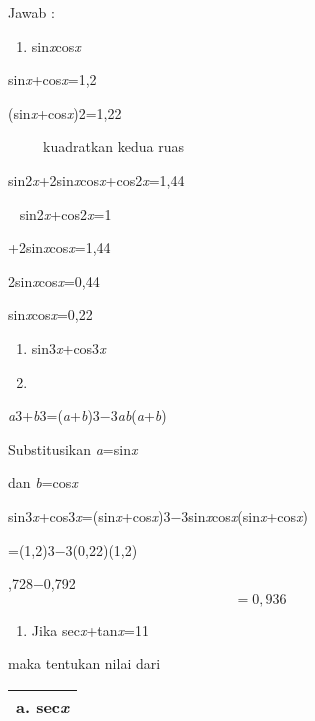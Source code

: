 \documentclass[11pt,fleqn]{book} %
\begin{document}
\begin{myEnumerate}
\begin{itemize}
\begin{tabular}{|p{0.0in}|} \hline 
 \\ \hline 
\end{tabular}

Jawab : 

\begin{enumerate}
\item  sin\textit{x}cos\textit{x}
\end{enumerate}

\noindent sin\textit{x}+cos\textit{x}=1,2

\noindent (sin\textit{x}+cos\textit{x})2=1,22

\noindent ~ ~ ~ kuadratkan kedua ruas 

\noindent sin2\textit{x}+2sin\textit{x}cos\textit{x}+cos2\textit{x}=1,44

\noindent ~ sin2\textit{x}+cos2\textit{x}=1

+2sin\textit{x}cos\textit{x}=1,44

\noindent 2sin\textit{x}cos\textit{x}=0,44

\noindent sin\textit{x}cos\textit{x}=0,22

\noindent 

\begin{enumerate}
\item  sin3\textit{x}+cos3\textit{x}

\item  
\end{enumerate}

\noindent \textit{a}3+\textit{b}3=(\textit{a}+\textit{b})3$\mathrm{-}$3\textit{ab}(\textit{a}+\textit{b})

\noindent Substitusikan \textit{a}=sin\textit{x}

\noindent dan \textit{b}=cos\textit{x}

\noindent sin3\textit{x}+cos3\textit{x}=(sin\textit{x}+cos\textit{x})3$\mathrm{-}$3sin\textit{x}cos\textit{x}(sin\textit{x}+cos\textit{x})

\noindent =(1,2)3$\mathrm{-}$3(0,22)(1,2)

,728$\mathrm{-}$0,792
\[=0,936\] 

\begin{enumerate}
\item  Jika sec\textit{x}+tan\textit{x}=11
\end{enumerate}

\noindent maka tentukan nilai dari 

\begin{tabular}{|p{0.3in}|} \hline 
a. sec\textit{x} \\ \hline 
\end{tabular}




\end{itemize}
\end{myEnumerate}
\end{document}
